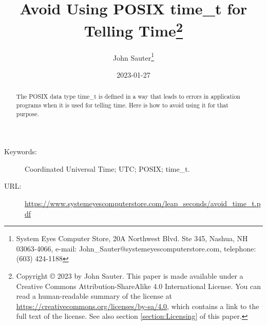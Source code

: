 \documentclass[letterpaper,twoside]{article}
\begin{document}
\title{Avoid Using POSIX {\ttfamily time\_t} for Telling
  Time\footnote{Copyright
    {\copyright} 2023 by John Sauter.
    This paper is made available under a
    Creative Commons Attribution-ShareAlike 4.0 International License.
    You can read a human-readable summary of the license at
    \href{https://creativecommons.org/licenses/by-sa/4.0}{https://creativecommons.org/licenses/by-sa/4.0},
    which contains a link to the full text of the license.
    See also section \ref{section:Licensing} of this paper.}
}
\author{John Sauter\footnote{
    System Eyes Computer Store,
    20A Northwest Blvd.  Ste 345,
    Nashua, NH  03063-4066,
    e-mail: John\_Sauter@systemeyescomputerstore.com,
    telephone: (603) 424-1188}}

\date{2023-01-27}
\maketitle
\begin{abstract}
  The POSIX data type {\ttfamily time\_t} is defined in a way that leads
  to errors in application programs when it is used for telling time.
  Here is how to avoid using it for that purpose.
\end{abstract}
\begin{description}
\item[Keywords:]Coordinated Universal Time; UTC; POSIX; time\_t.
\item[URL:]\href{https://www.systemeyescomputerstore.com/leap\_seconds/avoid\_time\_t.pdf}{https://www.systemeyescomputerstore.com/leap\_seconds/avoid\_time\_t.pdf}
\end{description}
\newpage
\end{document}
